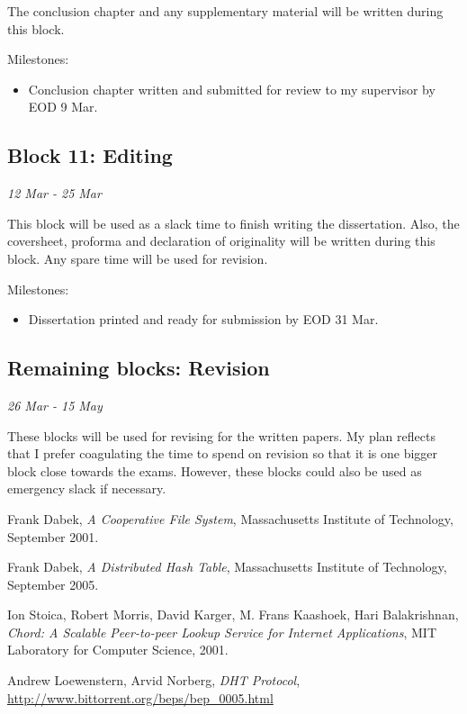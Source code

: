 \documentclass[12pt]{article}
\begin{document}
The conclusion chapter and any supplementary material will be written during this block.

Milestones:
\begin{itemize}
\item{Conclusion chapter written and submitted for review to my supervisor by EOD 9 Mar.}

\end{itemize}

\subsection{Block 11: Editing}
\emph{12 Mar - 25 Mar} %

This block will be used as a slack time to finish writing the dissertation. Also, the coversheet, proforma and declaration of originality will be written during this block. Any spare time will be used for revision.

Milestones:
\begin{itemize}
\item{Dissertation printed and ready for submission by EOD 31 Mar.}
\end{itemize}

\subsection{Remaining blocks: Revision}
\emph{26 Mar - 15 May}  %

These blocks will be used for revising for the written papers. My plan reflects that I prefer coagulating the time to spend on revision so that it is one bigger block close towards the exams. However, these blocks could also be used as emergency slack if necessary.

\clearpage
\begin{thebibliography}{9}

  Frank Dabek,
  \emph{A Cooperative File System},
  Massachusetts Institute of Technology,
  September 2001.

  Frank Dabek,
  \emph{A Distributed Hash Table},
  Massachusetts Institute of Technology,
  September 2005.

  Ion Stoica, Robert Morris, David Karger, M. Frans Kaashoek, Hari Balakrishnan,
  \emph{Chord: A Scalable Peer-to-peer Lookup Service for Internet Applications},
  MIT Laboratory for Computer Science,
  2001.

  Andrew Loewenstern, Arvid Norberg,
  \emph{DHT Protocol},
  \url{http://www.bittorrent.org/beps/bep_0005.html}


\end{thebibliography}
\end{document}
